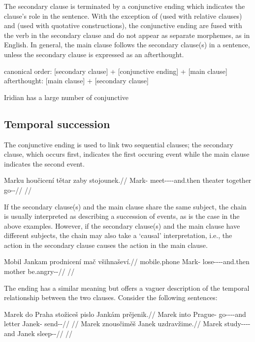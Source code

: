 The secondary clause is terminated by a {\sc conjunctive ending}
 which indicates the clause's role in the sentence.
With the exception of  (used with relative clauses) and  (used
with quotative constructions), the conjunctive ending are fused with the verb in
the secondary clause and do not appear as separate morphemes, as in English. In
general, the main clause follows the secondary clause(s) in a sentence, unless
the secondary clause is expressed as an afterthought.

\pex
\a canonical order: [secondary clause] + [conjunctive ending] + [main clause]
\a afterthought: [main clause] + [secondary clause]
\xe

Iridian has a large number of conjunctive 

\subsection{Temporal succession}
\label{sec:temporal-succession}

The conjunctive ending  is used to link two sequential
clauses; the secondary clause, which occurs first, indicates the first occuring
event while the main clause indicates the second event.

\pex
\begingl
  \gla Marku houčicení tětar zaby stojounek.//
  \glb Mark-\Ins{} meet-\Av{}-\Pf{}-\Cnj{}-and.then theater together
        go-\Lv{}-\Pf{}//
  \glft {}//
\endgl
\xe

If the secondary clause(s) and the main clause share the same subject, the chain
is usually interpreted as describing a succession of events, as is the case in
the above examples. However, if the secondary clause(s) and the main clause have
different subjects, the chain may also take a `causal' interpretation, i.e., the
action in the secondary clause causes the action in the main clause.

\pex
\begingl
  \gla Mobil Jankam prodnicení mač všihnaševí.//
  \glb mobile.phone Mark-\Agt{} lose-\Pv{}-\Pf{}-\Cnj{}-and.then mother be.angry-\Av{}-\Cont{}//
  \glft {}//
\endgl
\xe

The ending  has a similar meaning but offers a vaguer
description of the temporal relationship between the two clauses. Consider the
following sentences:

\pex
\a\label{ex:sz-perf}
\begingl
  \gla Marek do Praha stožiceš pislo Jankám prějenik.//
  \glb Marek into Prague-\Acc{} go-\Av{}-\Pf{}-\Cnj{}-and letter Janek-\Agt{}
  send-\Pv{}-\Pf{}//
  \glft {}//
\endgl
\a\label{ex:sz-prog}
\begingl
  \gla Marek znousčiměš Janek uzdravžime.//
  \glb Marek study-\Av{}-\Prog{}-\Cnj{}-and Janek sleep-\Av{}-\Prog{}//
  \glft {}//
\endgl
\xe

